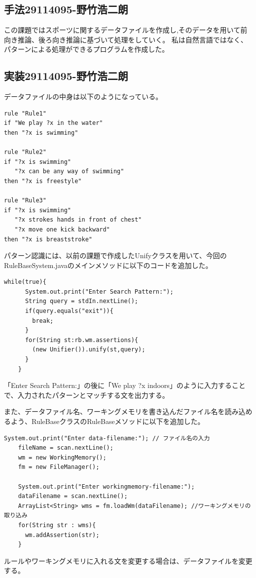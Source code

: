 \documentclass{jarticle}
\begin{document}
\subsection{手法29114095-野竹浩二朗}
この課題ではスポーツに関するデータファイルを作成し,そのデータを用いて前向き推論、後ろ向き推論に基づいて処理をしていく。
私は自然言語ではなく、パターンによる処理ができるプログラムを作成した。

\subsection{実装29114095-野竹浩二朗}
データファイルの中身は以下のようになっている。
\begin{screen}
\begin{verbatim}
rule "Rule1"
if "We play ?x in the water"
then "?x is swimming"

rule "Rule2"
if "?x is swimming"
   "?x can be any way of swimming"
then "?x is freestyle"

rule "Rule3"
if "?x is swimming"
   "?x strokes hands in front of chest"
   "?x move one kick backward"
then "?x is breaststroke"
\end{verbatim}
\end{screen}
パターン認識には、以前の課題で作成したUnifyクラスを用いて、今回のRuleBaseSystem.javaのメインメソッドに以下のコードを追加した。
\begin{lstlisting}[caption=追加したコード]
    while(true){
      System.out.print("Enter Search Pattern:");
      String query = stdIn.nextLine();
      if(query.equals("exit")){
        break;
      }
      for(String st:rb.wm.assertions){
        (new Unifier()).unify(st,query);
      }
    }
\end{lstlisting}
「Enter Search Pattern:」の後に「We play ?x indoors」のように入力することで、入力されたパターンとマッチする文を出力する。

また、データファイル名、ワーキングメモリを書き込んだファイル名を読み込めるよう、RuleBaseクラスのRuleBaseメソッドに以下を追加した。
\begin{lstlisting}[caption=RuleBaseメソッド]
    System.out.print("Enter data-filename:"); // ファイル名の入力
    fileName = scan.nextLine();
    wm = new WorkingMemory();
    fm = new FileManager();

    System.out.print("Enter workingmemory-filename:");
    dataFilename = scan.nextLine();
    ArrayList<String> wms = fm.loadWm(dataFilename); //ワーキングメモリの取り込み
    for(String str : wms){
      wm.addAssertion(str);
    }
\end{lstlisting}
ルールやワーキングメモリに入れる文を変更する場合は、データファイルを変更する。
\end{document}
